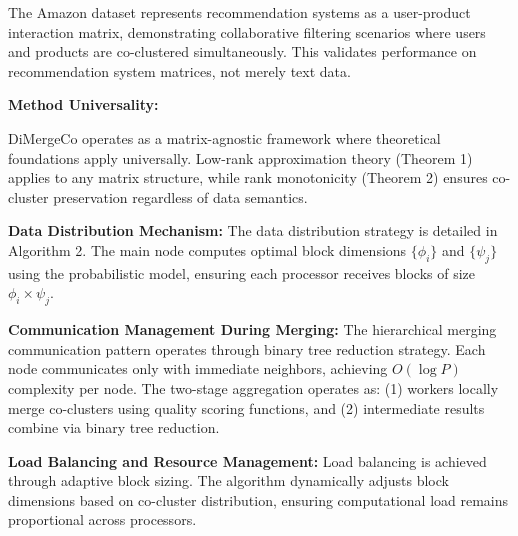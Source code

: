 \documentclass{ar2rc}
\begin{document}
The Amazon dataset represents recommendation systems as a user-product interaction matrix, demonstrating collaborative filtering scenarios where users and products are co-clustered simultaneously. This validates performance on recommendation system matrices, not merely text data.

\textbf{Method Universality:}

DiMergeCo operates as a matrix-agnostic framework where theoretical foundations apply universally. Low-rank approximation theory (Theorem 1) applies to any matrix structure, while rank monotonicity (Theorem 2) ensures co-cluster preservation regardless of data semantics.



\textbf{Data Distribution Mechanism:}
The data distribution strategy is detailed in Algorithm 2. The main node computes optimal block dimensions $\{\phi_i\}$ and $\{\psi_j\}$ using the probabilistic model, ensuring each processor receives blocks of size $\phi_i \times \psi_j$.

\textbf{Communication Management During Merging:}
The hierarchical merging communication pattern operates through binary tree reduction strategy. Each node communicates only with immediate neighbors, achieving $O(\log P)$ complexity per node. The two-stage aggregation operates as: (1) workers locally merge co-clusters using quality scoring functions, and (2) intermediate results combine via binary tree reduction.

\textbf{Load Balancing and Resource Management:}
Load balancing is achieved through adaptive block sizing. The algorithm dynamically adjusts block dimensions based on co-cluster distribution, ensuring computational load remains proportional across processors.


\end{document}
